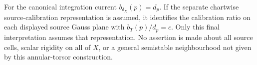 \begin{proposition}
For the canonical integration current \(b_{\delta_X}(p)=d_p\).
If the separate chartwise source-calibration representation
is assumed, it identifies the calibration ratio on each
displayed source Gauss plane with \(b_T(p)/d_p=c\).
Only this final interpretation assumes that representation.
No assertion is made about all source cells, scalar rigidity
on all of \(X\), or a general semistable neighbourhood not
given by this annular-torsor construction.
\end{proposition}

